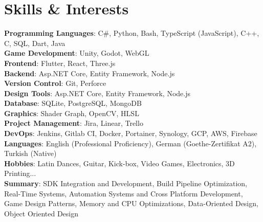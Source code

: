 \documentclass[letterpaper,11pt]{article}
\begin{document}
\section{Skills \& Interests}
 \begin{itemize}[leftmargin=0.15in, label={}]
    \small{\item{
    \vspace{1mm}
     \textbf{Programming Languages}{: C\#, Python, Bash, TypeScript (JavaScript), C++, C, SQL, Dart, Java} \\
     \textbf{Game Development}{: Unity, Godot, WebGL} \\
     \textbf{Frontend}{: Flutter, React, Three.js} \\
     \textbf{Backend}{: Asp.NET Core, Entity Framework, Node.js} \\
     \textbf{Version Control}{: Git, Perforce} \\
     \textbf{Design Tools}{: Asp.NET Core, Entity Framework, Node.js} \\
     \textbf{Database}{: SQLite, PostgreSQL, MongoDB} \\
     \textbf{Graphics}{: Shader Graph, OpenCV, HLSL} \\
     \textbf{Project Management}{: Jira, Linear, Trello} \\
     \textbf{DevOps}{: Jenkins, Gitlab CI, Docker, Portainer, Synology, GCP, AWS, Firebase} \\
     \textbf{Languages}{: English (Professional Proficiency), German (Goethe-Zertifikat A2), Turkish (Native)} \\
     \textbf{Hobbies}{: Latin Dances, Guitar, Kick-box, Video Games, Electronics, 3D Printing... } \\
     \vspace{1mm}
     \textbf{Summary}{: SDK Integration and Development, Build Pipeline Optimization, Real-Time Systems, Automation Systems and Cross Platform Development, Game Design Patterns, Memory and CPU Optimizations, Data-Oriented Design, Object Oriented Design} \\
     \vspace{1mm}

    }}
 \end{itemize}
\end{document}
